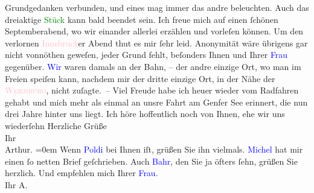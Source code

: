                     Grundgedanken verbunden, und eines mag immer das andre beleuchten. Auch das
                    dreiaktige \textcolor{green}{Stück}{} kann
                    bald beendet sein.\pend
           \pstart
           Ich freue mich auf einen ſchönen Septemberabend, wo wir einander allerlei
                    erzählen und vorleſen{\pb} können. Um den verlornen
                        \textcolor{pink}{Innsbruck}{}\ledrightnote{\textcolor{pink}{Innsbruck}}er Abend thut es mir ſehr leid.
                    Anonymität wäre übrigens gar nicht vonnöthen geweſen, jeder Grund fehlt,
                    beſonders Ihnen und Ihrer \textcolor{blue}{Frau}{} gegenüber. \textcolor{blue}{Wir}{} waren damals an der Bahn, – der andre einzige Ort, wo man \strikeout{\textcolor{gray}{nie}} im Freien speiſen kann, nachdem mir der dritte einzige Ort, in der Nähe
                    der \textcolor{pink}{\textsc{Weierburg}}{}\ledrightnote{\textcolor{pink}{Schloss Weiherburg}}, nicht zuſagte. –\pend
           \pstart
           Viel Freude habe ich heuer wieder vom Radfahren gehabt und mich mehr{\pb} als einmal an unsre Fahrt am Genfer See erinnert, die nun drei Jahre hinter uns
                    liegt.\pend
           \pstart
           Ich höre hoffentlich noch von Ihnen, ehe wir uns wiederſehn\pend
           \pstart
           Herzliche Grüße{\\[\baselineskip]}Ihr{\\[\baselineskip]}\spacefill\mbox{Arthur.}\pend
           \leftskip=0em{}\pstart
           \noindent{}Wenn \textcolor{blue}{Poldi}{}\ledrightnote{\textcolor{blue}{Leopold von Andrian-Werburg}} bei Ihnen iſt, grüßen Sie
                        ihn vielmals. \textcolor{blue}{Michel}{}\ledrightnote{\textcolor{blue}{Robert Michel}} hat mir einen ſo
                        netten Brief geſchrieben. Auch \textcolor{blue}{Bahr}{}\ledrightnote{\textcolor{blue}{Hermann Bahr}},
                        den Sie ja öfters ſehn, grüßen Sie herzlich. Und empfehlen mich Ihrer \textcolor{blue}{Frau}{}.{\\}Ihr
                            \spacefill\mbox{A.}\pend
           \endnumbering{}  
      